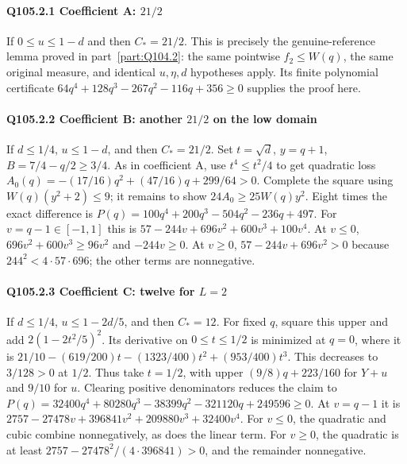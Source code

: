 \paragraph{Q105.2.1 Coefficient A: $21/2$}
If $0\le\allowbreak  u\le\allowbreak 1-d$ and
then $C_*=\allowbreak 21/2$. This is precisely the genuine-reference lemma proved in
part~\ref{part:Q104.2}: the same pointwise $f_2\le\allowbreak  W(q)$, the same original
measure, and identical $u,\allowbreak \eta,\allowbreak d$ hypotheses apply. Its finite polynomial
certificate $64q^4+128q^3-267q^2-116q+356\ge\allowbreak 0$ supplies the proof here.

\paragraph{Q105.2.2 Coefficient B: another $21/2$ on the low domain}
If $d\le\allowbreak 1/4$, $u\le\allowbreak 1-d$, and
then $C_*=\allowbreak 21/2$. Set $t=\allowbreak \sqrt d$, $y=\allowbreak q+1$, $B=\allowbreak 7/4-q/2\ge\allowbreak 3/4$.
As in coefficient A, use $t^4\le\allowbreak  t^2/4$ to get quadratic loss
$A_0(q)=\allowbreak -(17/16)q^2+(47/16)q+299/64>\allowbreak 0$.
Complete the square using $W(q)(y^2+2)\le\allowbreak 9$; it remains to show
$24A_0\ge\allowbreak 25W(q)y^2$. Eight times the exact difference is
$P(q)=\allowbreak 100q^4+200q^3-504q^2-236q+497$.
For $v=\allowbreak q-1\in[-1,\allowbreak 1]$ this is
$57-244v+696v^2+600v^3+100v^4$.
At $v\le\allowbreak 0$, $696v^2+600v^3\ge\allowbreak 96v^2$ and $-244v\ge\allowbreak 0$.
At $v\ge\allowbreak 0$, $57-244v+696v^2>\allowbreak 0$ because $244^2<\allowbreak 4\cdot57\cdot696$;
the other terms are nonnegative.

\paragraph{Q105.2.3 Coefficient C: twelve for $L=\allowbreak 2$}
If $d\le\allowbreak 1/4$, $u\le\allowbreak 1-2d/5$, and
then $C_*=\allowbreak 12$. For fixed $q$, square this upper and add
$2(1-2t^2/5)^2$. Its derivative on $0\le\allowbreak  t\le\allowbreak 1/2$ is minimized at
$q=\allowbreak 0$, where it is
$21/10-(619/200)t-(1323/400)t^2+(953/400)t^3$.
This decreases to $3/128>\allowbreak 0$ at $1/2$.
Thus take $t=\allowbreak 1/2$, with upper $(9/8)q+223/160$ for $Y+u$ and $9/10$
for $u$. Clearing positive denominators reduces the claim to
$P(q)=\allowbreak 32400q^4+80280q^3-38399q^2-321120q+249596\ge\allowbreak 0$.
At $v=\allowbreak q-1$ it is
$2757-27478v+396841v^2+209880v^3+32400v^4$.
For $v\le\allowbreak 0$, the quadratic and cubic combine nonnegatively, as does the
linear term. For $v\ge\allowbreak 0$, the quadratic is at least
$2757-27478^2/(4\cdot396841)>\allowbreak 0$, and the remainder nonnegative.

